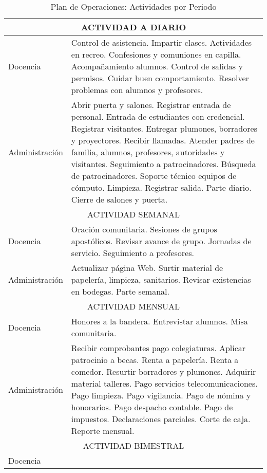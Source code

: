 \begin{table}
    \centering
    \caption{Plan de Operaciones: Actividades por Periodo}
    \label{tbl:Oper:Actividades}
    \footnotesize
    \begin{tabular}{l|p{}}
        \multicolumn{2}{c}{ACTIVIDAD A DIARIO} \\ 
        \hline
        \hline
        Docencia &
        Control de asistencia. Impartir clases. Actividades en recreo. Confesiones y comuniones en capilla. Acompañamiento alumnos. Control de salidas y permisos. Cuidar buen comportamiento. Resolver problemas con alumnos y profesores. \\ 
        \hline
        Administración &
        Abrir puerta y salones. Registrar entrada de personal. Entrada de estudiantes con credencial. Registrar visitantes. Entregar plumones, borradores y proyectores. Recibir llamadas. Atender padres de familia, alumnos, profesores, autoridades y visitantes. Seguimiento a patrocinadores. Búsqueda de patrocinadores. Soporte técnico equipos de cómputo. Limpieza. Registrar salida. Parte diario. Cierre de salones y puerta. \\
        \hline
        \multicolumn{2}{c}{ACTIVIDAD SEMANAL} \\ 
        \hline
        \hline
        Docencia &
        Oración comunitaria. Sesiones de grupos apostólicos. Revisar avance de grupo. Jornadas de servicio. Seguimiento a profesores. \\ 
        \hline
        Administración &
        Actualizar página Web. Surtir material de papelería, limpieza, sanitarios. Revisar existencias en bodegas. Parte semanal. \\
        \hline
        \multicolumn{2}{c}{ACTIVIDAD MENSUAL} \\ 
        \hline
        \hline
        Docencia &
        Honores a la bandera. Entrevistar alumnos. Misa comunitaria. \\ 
        \hline
        Administración &
        Recibir comprobantes pago colegiaturas. Aplicar patrocinio a becas. Renta a papelería. Renta a comedor. Resurtir borradores y plumones. Adquirir material talleres. Pago servicios telecomunicaciones. Pago limpieza. Pago vigilancia. Pago de nómina y honorarios. Pago despacho contable. Pago de impuestos. Declaraciones parciales. Corte de caja. Reporte mensual. \\
        \hline
        \multicolumn{2}{c}{ACTIVIDAD BIMESTRAL} \\ 
        \hline
        \hline
        Docencia &

\end{tabular}
\end{table}
